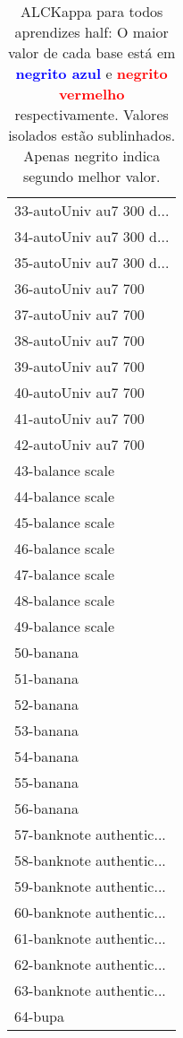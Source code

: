 \begin{table}[h]
\caption{ALCKappa para todos aprendizes half: O maior valor de cada base está em \textcolor{blue}{\textbf{negrito azul}} e \textcolor{red}{\textbf{negrito vermelho}} respectivamente. Valores isolados estão sublinhados. Apenas negrito indica segundo melhor valor.}
\begin{center}\begin{tabular}{l}
 & \\ \hline 33-autoUniv au7 300 d... &  \\
34-autoUniv au7 300 d... &  \\
35-autoUniv au7 300 d... &  \\
36-autoUniv au7 700 &  \\
37-autoUniv au7 700 &  \\
38-autoUniv au7 700 &  \\
39-autoUniv au7 700 &  \\ \hline
40-autoUniv au7 700 &  \\
41-autoUniv au7 700 &  \\
42-autoUniv au7 700 &  \\
43-balance scale &  \\
44-balance scale &  \\
45-balance scale &  \\
46-balance scale &  \\ \hline
47-balance scale &  \\
48-balance scale &  \\
49-balance scale &  \\
50-banana &  \\
51-banana &  \\
52-banana &  \\
53-banana &  \\ \hline
54-banana &  \\
55-banana &  \\
56-banana &  \\
57-banknote authentic... &  \\
58-banknote authentic... &  \\
59-banknote authentic... &  \\
60-banknote authentic... &  \\ \hline
61-banknote authentic... &  \\
62-banknote authentic... &  \\
63-banknote authentic... &  \\
64-bupa &  \\\end{tabular}\label{stratsALCKappa1AllReduxb}
\end{center}
\end{table}
